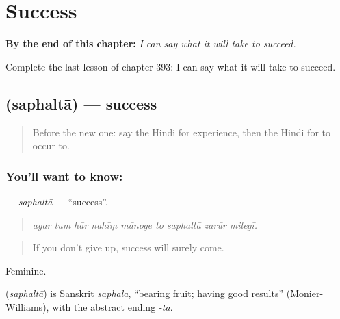 
\chapter{Success}
\label{ch:hi-success}

\begin{chapteropening}
\textbf{By the end of this chapter:} \emph{I can say what it will take to succeed.}

Complete the last lesson of chapter 393: I can say what it will take to succeed.
\end{chapteropening}

\section[\texorpdfstring{\hi{सफलता} (saphaltā)}{सफलता (saphaltā)}]{ (saphaltā) — success}

\label{lesson:HI-C393-saphalta}



\begin{quote}
Before the new one: say the Hindi for experience, then the Hindi for to occur to.
\end{quote}

\subsection*{You'll want to know: }
\textbf{} — \emph{saphaltā} — \textquotedblleft{}success\textquotedblright{}.

\begin{quote}
        
\end{quote}

\begin{quote}
\emph{agar tum hār nahīṃ mānoge to saphaltā zarūr milegī.}
\end{quote}

\begin{quote}
If you don't give up, success will surely come.
\end{quote}

Feminine.

\begin{cousinweb}
\textbf{} (\emph{saphaltā}) is Sanskrit \emph{saphala}, \textquotedblleft{}bearing fruit; having good results\textquotedblright{} (Monier-Williams), with the abstract ending \emph{-tā}.
\end{cousinweb}

